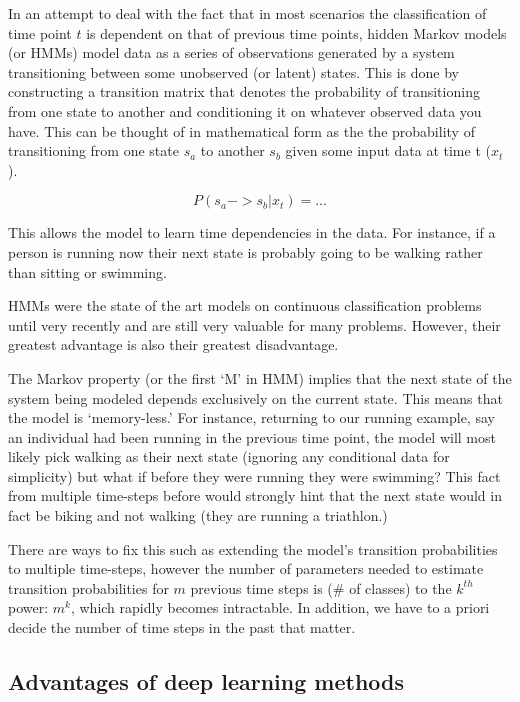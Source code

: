 \documentclass[]{book}
\theoremstyle{definition}
\theoremstyle{definition}
\theoremstyle{definition}
\theoremstyle{remark}
\begin{document}
In an attempt to deal with the fact that in most scenarios the
classification of time point \(t\) is dependent on that of previous time
points, hidden Markov models (or HMMs) model data as a series of
observations generated by a system transitioning between some unobserved
(or latent) states. This is done by constructing a transition matrix
that denotes the probability of transitioning from one state to another
and conditioning it on whatever observed data you have. This can be
thought of in mathematical form as the the probability of transitioning
from one state \(s_a\) to another \(s_b\) given some input data at time
t (\(x_t\)).

\[P(s_a -> s_b | x_t) = ...\]

This allows the model to learn time dependencies in the data. For
instance, if a person is running now their next state is probably going
to be walking rather than sitting or swimming.

HMMs were the state of the art models on continuous classification
problems until very recently and are still very valuable for many
problems. However, their greatest advantage is also their greatest
disadvantage.

The Markov property (or the first `M' in HMM) implies that the next
state of the system being modeled depends exclusively on the current
state. This means that the model is `memory-less.' For instance,
returning to our running example, say an individual had been running in
the previous time point, the model will most likely pick walking as
their next state (ignoring any conditional data for simplicity) but what
if before they were running they were swimming? This fact from multiple
time-steps before would strongly hint that the next state would in fact
be biking and not walking (they are running a triathlon.)

There are ways to fix this such as extending the model's transition
probabilities to multiple time-steps, however the number of parameters
needed to estimate transition probabilities for \(m\) previous time
steps is (\# of classes) to the \(k^{th}\) power: \(m^k\), which rapidly
becomes intractable. In addition, we have to a priori decide the number
of time steps in the past that matter.

\subsection{Advantages of deep learning
methods}\label{advantages-of-deep-learning-methods}
\end{document}
